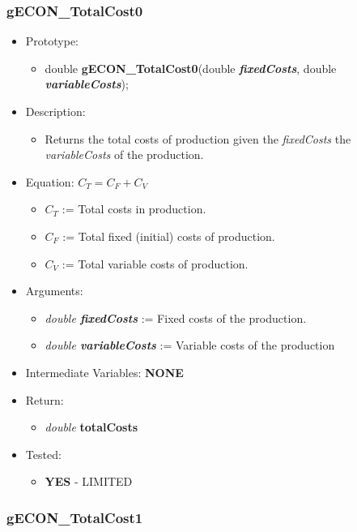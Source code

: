 \documentclass{article}
\begin{document}
{{{{{{%
\cleardoublepage
\subsubsection{gECON\_TotalCost0}

\begin{itemize}
\item Prototype:
	\begin{itemize}
	\item double \textbf{gECON\_TotalCost0}(double \textbf{\textit{fixedCosts}}, double \textbf{\textit{variableCosts}});
	\end{itemize}
\item Description:
	\begin{itemize}
	\item Returns the total costs of production given the \textit{fixedCosts} the \textit{variableCosts} of the production.
	\end{itemize}
\item Equation:     $C_T = C_F + C_V$
	\begin{itemize}[noitemsep]
	\item $C_T$ := Total costs in production.
	\item $C_F$ := Total fixed (initial) costs of production.
	\item $C_V$ := Total variable costs of production.
	\end{itemize}
\item Arguments:
	\begin{itemize}[noitemsep]
	\item \textit{double \textbf{fixedCosts}} := Fixed costs of the production.
	\item \textit{double \textbf{variableCosts}} := Variable costs of the production
	\end{itemize} 
\item Intermediate Variables: \textbf{NONE}
\item Return:
	\begin{itemize}
	\item \textit{double} \textbf{totalCosts}
	\end{itemize}
\item Tested:
	\begin{itemize}
	\item \textbf{YES} - LIMITED
	\end{itemize}
\end{itemize}

\cleardoublepage
\subsubsection{gECON\_TotalCost1}

}}}}}}
\end{document}
